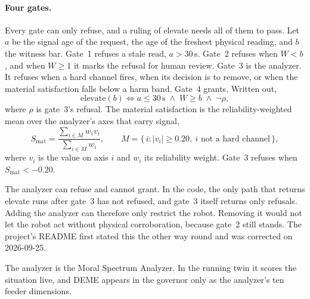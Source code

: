 \paragraph{Four gates.} Every gate can only refuse, and a ruling of elevate needs all of them to
pass. Let $a$ be the signal age of the request, the age of the freshest physical reading, and $b$ the
witness bar. Gate~1 refuses a stale read, $a > 30$\,s. Gate~2 refuses when $W < b$, and when
$W \ge 1$ it marks the refusal for human review. Gate~3 is the analyzer. It refuses when a hard
channel fires, when its decision is to remove, or when the material satisfaction falls below a harm
band. Gate~4 grants. Written out,
\begin{equation}
\mathrm{elevate}(b) \iff a \le 30\,\mathrm{s} \;\wedge\; W \ge b \;\wedge\; \neg\rho ,
\label{eq:govern}
\end{equation}
where $\rho$ is gate~3's refusal. The material satisfaction is the reliability-weighted mean over the
analyzer's axes that carry signal,
\begin{equation}
S_{\mathrm{mat}} = \frac{\sum_{i\in M} w_i v_i}{\sum_{i\in M} w_i},\qquad
M = \{\, i : |v_i| \ge 0.20,\ i \text{ not a hard channel} \,\},
\label{eq:smat}
\end{equation}
where $v_i$ is the value on axis $i$ and $w_i$ its reliability weight. Gate~3 refuses when
$S_{\mathrm{mat}} < -0.20$.

The analyzer can refuse and cannot grant. In the code, the only path that returns elevate runs after
gate~3 has not refused, and gate~3 itself returns only refusals. Adding the analyzer can therefore
only restrict the robot. Removing it would not let the robot act without physical corroboration,
because gate~2 still stands. The project's README first stated this the other way round and was
corrected on 2026-09-25.

The analyzer is the Moral Spectrum Analyzer. In the running twin it scores the situation live, and
DEME appears in the governor only as the analyzer's ten feeder dimensions.


